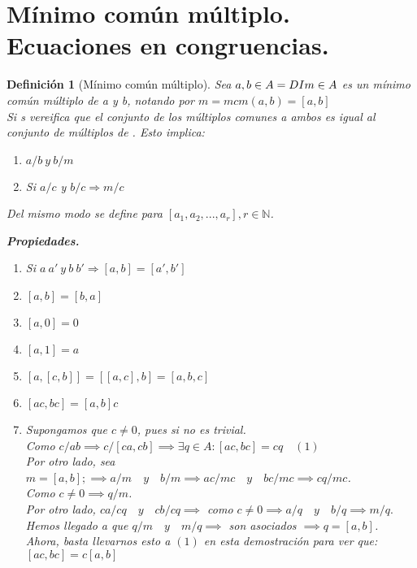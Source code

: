 \documentclass[11pt, a4paper, titlepage]{article}
\makeatletter
\renewenvironment{proof}[1][\proofname] {\vspace{-15pt}\par\pushQED{\qed}\normalfont\topsep6\p@\@plus6\p@\relax\trivlist\item[\hskip\labelsep\it#1\@addpunct{.}]\ignorespaces}{\popQED\endtrivlist\@endpefalse}
\theoremstyle{theorem-style}
\theoremstyle{definition-style}
\newtheorem*{ndef}{Definición}
\theoremstyle{remark-style}
\theoremstyle{example-style}
\newenvironment{nlist}
{\begin{enumerate}
\renewcommand\labelenumi{(\emph{\roman{enumi})}}}
{\end{enumerate}}
\makeatother
\begin{document}
\section{Mínimo común múltiplo. Ecuaciones en congruencias.}
\begin{ndef}[Mínimo común múltiplo]
	Sea $a, b \in A =DI \\ m \in A $ es un mínimo común múltiplo de a y b, notando por $m = mcm(a,b) = [a,b]$  \\
Si s vereifica que el conjunto de los múltiplos comunes a ambos es igual al conjunto de múltiplos de . Esto implica: 
\begin{enumerate}
\item $a/b \ y \ b/m$
\item Si $a/c$ y $b/c \Rightarrow m/c$ \\
\end{enumerate}

Del mismo modo se define para $[a_1, a_2, ..., a_r],r \in \mathbb{N}$.

\textbf{Propiedades. }
\begin{nlist}
\item Si $a~a' \ y \ b~b' \Rightarrow [a,b]=[a',b']$
\item $[a,b] = [b,a]$
\item $[a,0] = 0$
\item $[a,1] = a$
\item $[a,[c,b]]= [[a,c],b] = [a,b,c]$
\item $[ac,bc] =[a,b]c$\\

\begin{proof}[Demostración del último.]
	
	Supongamos que $c\ne 0$, pues si no es trivial.\\
	Como $c/ab\implies c/[ca,cb] \implies \exists q \in A : [ac,bc] = cq\quad (1)$\\
	Por otro lado, sea $m = [a,b]; \implies a/m \quad y \quad b/m \implies ac/mc \quad y \quad bc/mc \implies cq/mc$.\\
	Como $c\ne 0 \implies q/m$.\\
	Por otro lado, $ca/cq \quad y \quad cb/cq \implies$ como $c\ne 0 \implies a/q \quad y \quad b/q \implies m/q.$\\
	Hemos llegado a que $q/m \quad y \quad m/q \implies $ son asociados $\implies q=[a,b]$.\\
	Ahora, basta llevarnos esto a $(1)$ en esta demostración para ver que:\\ $[ac,bc] = c[a,b]$
\end{proof}
\end{nlist}
\end{ndef}
\end{document}
